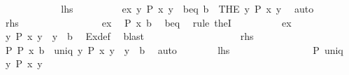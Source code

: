 \begin{isabellebody}
\ \ \ \ \isamarkupfalse%
\isanewline
\ \ \ \ \ \ \isamarkupfalse%
\ {\isachardoublequoteopen}{\isacharquery}{\kern0pt}lhs{\isachardoublequoteclose}\isanewline
\ \ \ \ \ \ \isamarkupfalse%
\ \isamarkupfalse%
\ ex{}{\isacharcolon}{\kern0pt}\ {\isachardoublequoteopen}{\isasymexists}{\isacharbang}{\kern0pt}y{\isachardot}{\kern0pt}\ P\ x\ y{\isachardoublequoteclose}\ \ b{\isacharunderscore}{\kern0pt}eq{\isacharcolon}{\kern0pt}\ {\isachardoublequoteopen}b\ {\isacharequal}{\kern0pt}\ {\isacharparenleft}{\kern0pt}THE\ y{\isachardot}{\kern0pt}\ P\ x\ y{\isacharparenright}{\kern0pt}{\isachardoublequoteclose}\ \isamarkupfalse%
\ auto\isanewline
\ \ \ \ \ \ \isamarkupfalse%
\ {\isacharquery}{\kern0pt}rhs\isanewline
\ \ \ \ \ \ \isamarkupfalse%
\isanewline
\ \ \ \ \ \ \ \ \isamarkupfalse%
\ ex{}\ \isamarkupfalse%
\ {\isachardoublequoteopen}P\ x\ b{\isachardoublequoteclose}\ \isamarkupfalse%
\ b{\isacharunderscore}{\kern0pt}eq\ \isamarkupfalse%
\ {\isacharparenleft}{\kern0pt}rule\ theI{\isacharprime}{\kern0pt}{\isacharparenright}{\kern0pt}\isanewline
\ \ \ \ \ \ \ \ \isamarkupfalse%
\ ex{}\ \isamarkupfalse%
\ {\isachardoublequoteopen}{\isasymforall}y{\isachardot}{\kern0pt}\ P\ x\ y\ {\isasymlongrightarrow}\ y\ {\isacharequal}{\kern0pt}\ b{\isachardoublequoteclose}\ \isamarkupfalse%
\ Ex{}{\isacharunderscore}{\kern0pt}def\ \isamarkupfalse%
\ blast\isanewline
\ \ \ \ \ \ \isamarkupfalse%
\isanewline
\ \ \ \ \isamarkupfalse%
\isanewline
\ \ \ \ \ \ \isamarkupfalse%
\ {\isacharquery}{\kern0pt}rhs\isanewline
\ \ \ \ \ \ \isamarkupfalse%
\ \isamarkupfalse%
\ P{\isacharcolon}{\kern0pt}\ {\isachardoublequoteopen}P\ x\ b{\isachardoublequoteclose}\ \ uniq{\isacharcolon}{\kern0pt}\ {\isachardoublequoteopen}{\isasymAnd}y{\isachardot}{\kern0pt}\ P\ x\ y\ {\isasymLongrightarrow}\ y\ {\isacharequal}{\kern0pt}\ b{\isachardoublequoteclose}\ \isamarkupfalse%
\ auto\isanewline
\ \ \ \ \ \ \isamarkupfalse%
\ {\isacharquery}{\kern0pt}lhs\isanewline
\ \ \ \ \ \ \isamarkupfalse%
\isanewline
\ \ \ \ \ \ \ \ \isamarkupfalse%
\ P\ uniq\ \isamarkupfalse%
\ {\isachardoublequoteopen}{\isasymexists}{\isacharbang}{\kern0pt}y{\isachardot}{\kern0pt}\ P\ x\ y{\isachardoublequoteclose}\ \isamarkupfalse%

\end{isabellebody}
